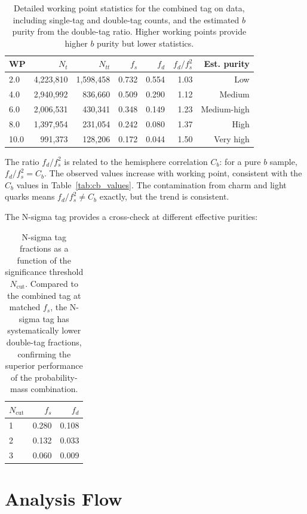 \documentclass[11pt,a4paper]{article}
\begin{document}
\begin{table}[htbp]
\centering
\caption{Detailed working point statistics for the combined tag on data, including
single-tag and double-tag counts, and the estimated $b$ purity from the double-tag
ratio. Higher working points provide higher $b$ purity but lower statistics.}
\label{tab:wp_detail}
\begin{tabular}{lrrrrrr}
\toprule
WP & $N_t$ & $N_{tt}$ & $f_s$ & $f_d$ & $f_d/f_s^2$ & Est. purity \\
\midrule
2.0 & 4,223,810 & 1,598,458 & 0.732 & 0.554 & 1.03 & Low \\
4.0 & 2,940,992 & 836,660 & 0.509 & 0.290 & 1.12 & Medium \\
6.0 & 2,006,531 & 430,341 & 0.348 & 0.149 & 1.23 & Medium-high \\
8.0 & 1,397,954 & 231,054 & 0.242 & 0.080 & 1.37 & High \\
10.0 & 991,373 & 128,206 & 0.172 & 0.044 & 1.50 & Very high \\
\bottomrule
\end{tabular}
\end{table}

The ratio $f_d / f_s^2$ is related to the hemisphere correlation $C_b$: for a pure $b$
sample, $f_d / f_s^2 = C_b$. The observed values increase with working point, consistent
with the $C_b$ values in Table~\ref{tab:cb_values}. The contamination from charm and
light quarks means $f_d / f_s^2 \neq C_b$ exactly, but the trend is consistent.

The N-sigma tag provides a cross-check at different effective purities:

\begin{table}[htbp]
\centering
\caption{N-sigma tag fractions as a function of the significance threshold $N_\mathrm{cut}$.
Compared to the combined tag at matched $f_s$, the N-sigma tag has systematically lower
double-tag fractions, confirming the superior performance of the probability-mass combination.}
\label{tab:nsigma_fractions}
\begin{tabular}{lrr}
\toprule
$N_\mathrm{cut}$ & $f_s$ & $f_d$ \\
\midrule
1 & 0.280 & 0.108 \\
2 & 0.132 & 0.033 \\
3 & 0.060 & 0.009 \\
\bottomrule
\end{tabular}
\end{table}

\section{Analysis Flow}
\label{app:analysis_flow}
\end{document}
